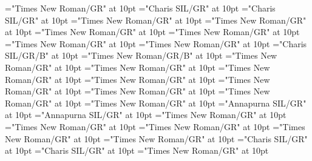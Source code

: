 \documentclass[a4paper]{article}
\begin{document}
\font\translationsexamplessensesensesentryletData="Times New Roman/GR" at 10pt
\font\translationLdtetranslationsexamplessensesensesentryletData="Charis SIL/GR" at 10pt
\font\spantetranslationLdtetranslationsexamplessensesensesentryletData="Charis SIL/GR" at 10pt
\font\spanentranslationLdtetranslationsexamplessensesensesentryletData="Times New Roman/GR" at 10pt
\font\complexformrefsentryletData="Times New Roman/GR" at 10pt
\font\complexformtypecomplexformrefsentryletData="Times New Roman/GR" at 10pt
\font\LexEntryTypepublishStemComplexFormTypeReverseAbbrPubencomplexformtypecomplexformrefsentryletData="Times New Roman/GR" at 10pt
\font\spanenLexEntryTypepublishStemComplexFormTypeReverseAbbrPubencomplexformtypecomplexformrefsentryletData="Times New Roman/GR" at 10pt
\font\spanencomplexformtypecomplexformrefsentryletData="Times New Roman/GR" at 10pt
\font\complexformformggoTeluINcomplexformrefsentryletData="Charis SIL/GR/B" at 10pt
\font\spanencomplexformformggoTeluINcomplexformrefsentryletData="Times New Roman/GR/B" at 10pt
\font\spanencomplexformrefsentryletData="Times New Roman/GR" at 10pt
\font\pictureRightentryletData="Times New Roman/GR" at 10pt
\font\picturepictureRightentryletData="Times New Roman/GR" at 10pt
\font\pictureCaptionpictureRightentryletData="Times New Roman/GR" at 10pt
\font\CmPicturepublishStemPileThumbnailPubpictureCaptionpictureRightentryletData="Times New Roman/GR" at 10pt
\font\spanenCmPicturepublishStemPileThumbnailPubpictureCaptionpictureRightentryletData="Times New Roman/GR" at 10pt
\font\pictureLabelenpictureCaptionpictureRightentryletData="Times New Roman/GR" at 10pt
\font\spanenpictureLabelenpictureCaptionpictureRightentryletData="Times New Roman/GR" at 10pt
\font\LexSensepublishStemGlossPubLehisensesensesentryletData="Annapurna SIL/GR" at 10pt
\font\spanhiLexSensepublishStemGlossPubLehisensesensesentryletData="Annapurna SIL/GR" at 10pt
\font\spanenLexSensepublishStemGlossPubLehisensesensesentryletData="Times New Roman/GR" at 10pt
\font\translationentranslationsexamplessensesensesentryletData="Times New Roman/GR" at 10pt
\font\xitementranslationentranslationsexamplessensesensesentryletData="Times New Roman/GR" at 10pt
\font\spanenxitementranslationentranslationsexamplessensesensesentryletData="Times New Roman/GR" at 10pt
\font\spanentranslationentranslationsexamplessensesensesentryletData="Times New Roman/GR" at 10pt
\font\xitemtetranslationentranslationsexamplessensesensesentryletData="Charis SIL/GR" at 10pt
\font\spantexitemtetranslationentranslationsexamplessensesensesentryletData="Charis SIL/GR" at 10pt
\font\spanenentryletData="Times New Roman/GR" at 10pt
\end{document}
